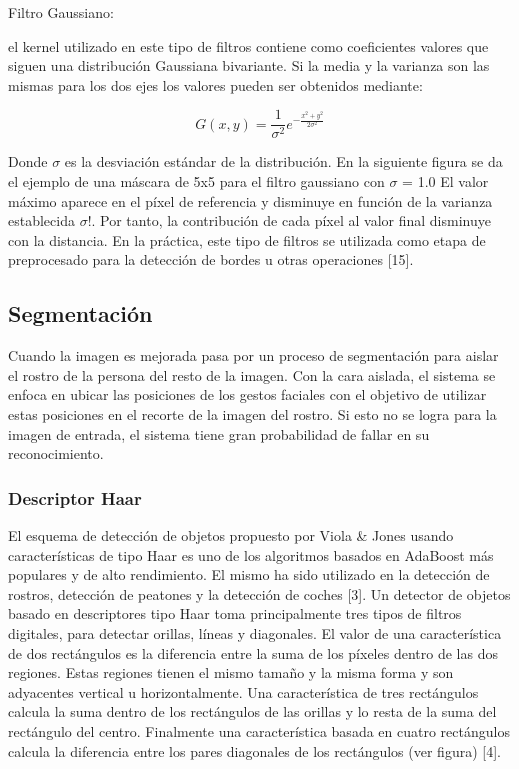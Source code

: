 \begin{enumerate}
\begin{itemize}
\begin{enumerate}
{\bf\item[B.3. ] Filtro Gaussiano:}
el kernel utilizado en este tipo de filtros contiene como coeficientes valores que siguen una distribución Gaussiana bivariante. Si la media y la varianza son las mismas para los dos ejes los valores pueden ser obtenidos mediante:

\begin{equation}
G(x,y)=\frac{1}{\sigma^2}{e^{-\frac{x^2+y^2}{2\sigma^2}}}
\end{equation}

Donde $\sigma$ es la desviación estándar de la distribución. En la siguiente figura se da el ejemplo de una máscara de 5x5 para el filtro gaussiano con $\sigma$ = 1.0 
\vskip 0.1cm
El valor máximo aparece en el píxel de referencia y disminuye en función de la varianza establecida $\sigma$!. Por tanto, la contribución de cada píxel al valor final disminuye con la distancia. En la práctica, este tipo de filtros se utilizada como etapa de preprocesado para la detección de bordes u otras operaciones [15].

\end{enumerate}

\end{itemize}
\end{enumerate}

\subsection{Segmentación}
Cuando la imagen es mejorada pasa por un proceso de segmentación para aislar el rostro de la persona del resto de la imagen. Con la cara aislada, el sistema se enfoca en ubicar las posiciones de los gestos faciales con el objetivo de utilizar estas posiciones en el recorte de la imagen del rostro. Si esto no se logra para la imagen de entrada, el sistema tiene gran probabilidad de fallar en su reconocimiento.

\subsubsection{Descriptor Haar}
El esquema de detección de objetos propuesto por Viola \& Jones usando características de tipo Haar es uno de los algoritmos basados en AdaBoost más populares y de alto rendimiento. El mismo ha sido utilizado en la detección de rostros, detección de peatones y la detección de coches [3].
\vskip 0.1cm
Un detector de objetos basado en descriptores tipo Haar toma principalmente tres tipos de filtros digitales, para detectar orillas, líneas y diagonales. El valor de una característica de dos rectángulos es la diferencia entre la suma de los píxeles dentro de las dos regiones. Estas regiones tienen el mismo tamaño y la misma forma y son adyacentes vertical u horizontalmente. Una característica de tres rectángulos calcula la suma dentro de los rectángulos de las orillas y lo resta de la suma del rectángulo del centro. Finalmente una característica basada en cuatro rectángulos calcula la diferencia entre los pares diagonales de los rectángulos (ver figura) [4].

